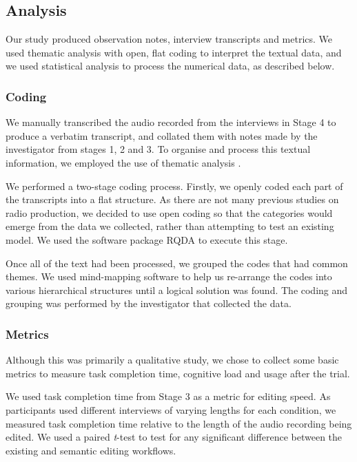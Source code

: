 \subsection{Analysis}
Our study produced observation notes, interview transcripts and metrics. We used thematic analysis with open, flat
coding to interpret the textual data, and we used statistical analysis to process the numerical data, as described below.

\subsubsection{Coding}
We manually transcribed the audio recorded from the interviews in Stage 4 to produce a verbatim transcript, and
collated them with notes made by the investigator from stages 1, 2 and 3. To organise and process this textual
information, we employed the use of thematic analysis \citep{Braun2006}.

We performed a two-stage coding process.  Firstly, we openly coded each part of the transcripts
into a flat structure.  As there are not many previous studies on radio production, we decided to
use open coding so that the categories would emerge from the data we collected, rather than attempting to test an
existing model.  We used the software package RQDA \citep{RQDA} to execute this stage.

Once all of the text had been processed, we grouped the codes that had common themes. We used mind-mapping software to
help us re-arrange the codes into various hierarchical structures until a logical solution was found.  The coding
and grouping was performed by the investigator that collected the data.

\subsubsection{Metrics}
Although this was primarily a qualitative study, we chose to collect some basic metrics to measure task completion
time, cognitive load and usage after the trial.

We used task completion time from Stage 3 as a metric for editing speed. As participants used different interviews of
varying lengths for each condition, we measured task completion time relative to the length of the audio
recording being edited. We used a paired \textit{t}-test \citep[p.~17]{Shalabh2009} to test for any significant
difference between the existing and semantic editing workflows.

